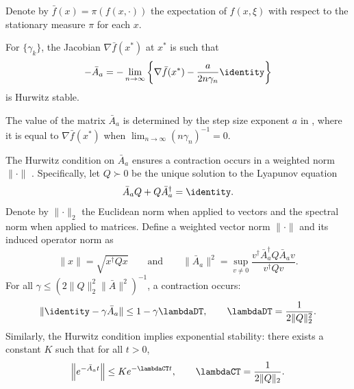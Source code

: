 \documentclass[11pt]{article}
\begin{document}
Denote by $\bar{f}(x) = \pi(f(x, \cdot))$ the expectation of $f(x, \xi)$ with respect to the stationary measure $\pi$ for each $x$. 
\begin{assumption}\label{ass:general_sa}
    For \stepsize $\{\gamma_k\}$, the Jacobian $\nabla \bar{f}(x^*)$ at $x^*$ is such that
    \begin{equation}\label{eq:hurwtiz}
        -\bar{A}_a = -\lim_{n \to \infty} \left \{\nabla \bar{f}(x^*) - \frac{a}{2 n \gamma_n} \identity \right\}
    \end{equation}    
    is Hurwitz stable. 
\end{assumption}
The value of the matrix $\bar{A}_a$ is determined by the step size exponent $a$ in , where it is equal to $\nabla \bar{f}(x^*)$ when $\lim_{n \to \infty} (n \gamma_n)^{-1} = 0$. 



The Hurwitz condition on $\bar{A}_a$ ensures a contraction occurs in a weighted norm $\lVert \cdot \rVert$ \citep[Lemma 17]{kaledin2020finite}. 
Specifically, let $Q \succ 0$ be the unique solution to the Lyapunov equation
\begin{equation}\label{eq:lyapunov}
    \bar{A}_a Q + Q \bar{A}_a^\dagger = \identity.
\end{equation}
Denote by $\lVert \cdot \rVert_2$ the Euclidean norm when applied to vectors and the spectral norm when applied to matrices.
Define a weighted vector norm $\lVert \cdot \rVert$ and its induced operator norm as
\begin{equation}\label{eq:weighted_norm}
    \lVert x \rVert = \sqrt{x^\dagger Q x} 
    \qquad 
    \text{and} \qquad 
    \lVert \bar{A}_a \rVert^2 
    =\sup_{v \neq 0} \frac{v^\dagger \bar{A}_a^\dagger Q \bar{A}_a v}{v^\dagger Q v} .     
\end{equation}
For all $\gamma\leq (2 \lVert Q \rVert_2^{2} \lVert \bar{A} \rVert^2)^{-1}$, a contraction occurs:
\begin{equation}\label{eq:contraction}
    \lVert \identity - \gamma \bar{A}_a \rVert \leq 1 - \gamma \lambdaDT ,
    \qquad 
    \lambdaDT = \frac{1}{2 \lVert Q \rVert_2^2} 
    . 
\end{equation}
Similarly, the Hurwitz condition implies exponential stability: there exists a constant $K$ such that for all $t > 0$, 
\begin{equation*}
    \left\lVert e^{-\bar{A}_a t} \right\rVert \leq K e^{-\lambdaCT t} , \qquad \lambdaCT = \frac{1}{2\lVert Q \rVert_2}. 
\end{equation*}
\end{document}
